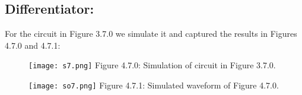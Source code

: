 \subsection{Differentiator:}

For the circuit in Figure 3.7.0 we simulate it and captured the results in Figures 4.7.0 and 4.7.1:

\begin{figure}[H]
\texttt{[image: s7.png]}
\centering \linebreak \linebreak Figure 4.7.0: Simulation of circuit in Figure 3.7.0.
\end{figure} \hfill

\begin{figure}[H]
\texttt{[image: so7.png]}
\centering \linebreak \linebreak Figure 4.7.1: Simulated waveform of Figure 4.7.0.
\end{figure} \hfill

\pagebreak